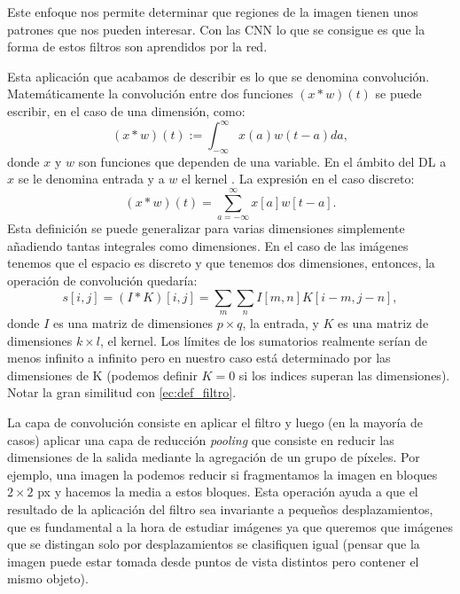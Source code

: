 \documentclass[a4paper,12pt,twoside,titlepage]{article}
\begin{document}
Este enfoque nos permite determinar que regiones de la imagen tienen unos patrones que nos pueden interesar. Con las CNN lo que se consigue es que la forma de estos filtros son aprendidos por la red. 

Esta aplicación que acabamos de describir es lo que se denomina convolución. Matemáticamente la convolución entre dos funciones $(x * w)(t)$ se puede escribir, en el caso de una dimensión, como:
\begin{equation}
  (x * w)(t):=\int_{-\infty}^{\infty} x(a) w(t-a) d a,
\end{equation}
donde $x$ y $w$ son funciones que dependen de una variable. En el ámbito del DL a $x$ se le denomina entrada y a $w$ el kernel \cite{dl_book}. La expresión en el caso discreto:
\begin{equation}
  (x * w)(t)=\sum_{a=-\infty}^{\infty} x[a] w[t-a].
  \end{equation}
Esta definición se puede generalizar para varias dimensiones simplemente añadiendo tantas integrales como dimensiones. En el caso de las imágenes tenemos que el espacio es discreto y que tenemos dos dimensiones, entonces, la operación de convolución quedaría:
\begin{equation}
  s[i, j]=(I * K)[i, j]=\sum_{m} \sum_{n} I[m, n] K[i-m, j-n],
\end{equation}
donde $I$ es una matriz de dimensiones $p\times q$, la entrada, y $K$ es una matriz de dimensiones $k\times l$, el kernel. Los límites de los sumatorios realmente serían de menos infinito a infinito pero en nuestro caso está determinado por las dimensiones de K (podemos definir $K = 0$ si los indices superan las dimensiones). Notar la gran similitud con \ref{ec:def_filtro}.


La capa de convolución consiste en aplicar el filtro y luego (en la mayoría de casos) aplicar una capa de reducción \textit{pooling} que consiste en reducir las dimensiones de la salida mediante la agregación de un grupo de píxeles. Por ejemplo, una imagen la podemos reducir si fragmentamos la imagen en bloques $2\times 2$ px y hacemos la media a estos bloques. Esta operación ayuda a que el resultado de la aplicación del filtro sea invariante a pequeños desplazamientos, que es fundamental a la hora de estudiar imágenes ya que queremos que imágenes que se distingan solo por desplazamientos se clasifiquen igual (pensar que la imagen puede estar tomada desde puntos de vista distintos pero contener el mismo objeto).
\end{document}
